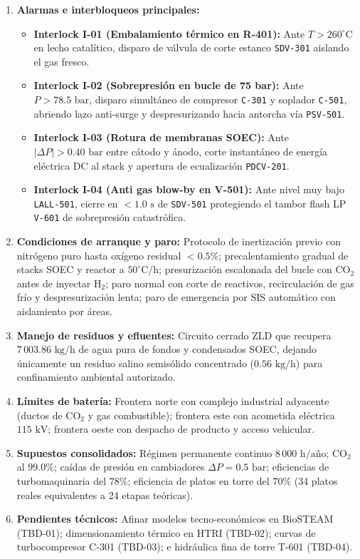 \documentclass[10pt,letterpaper]{article}
\begin{document}
\begin{enumerate}
    \item \textbf{Alarmas e interbloqueos principales:}
    \begin{itemize}
        \item \textbf{Interlock I-01 (Embalamiento térmico en R-401):} Ante $T > 260^\circ\text{C}$ en lecho catalítico, disparo de válvula de corte estanco \texttt{SDV-301} aislando el gas fresco.
        \item \textbf{Interlock I-02 (Sobrepresión en bucle de 75 bar):} Ante $P > 78.5\text{ bar}$, disparo simultáneo de compresor \texttt{C-301} y soplador \texttt{C-501}, abriendo lazo anti-surge y despresurizando hacia antorcha vía \texttt{PSV-501}.
        \item \textbf{Interlock I-03 (Rotura de membranas SOEC):} Ante $|\Delta P| > 0.40\text{ bar}$ entre cátodo y ánodo, corte instantáneo de energía eléctrica DC al stack y apertura de ecualización \texttt{PDCV-201}.
        \item \textbf{Interlock I-04 (Anti gas blow-by en V-501):} Ante nivel muy bajo \texttt{LALL-501}, cierre en $<1.0\text{ s}$ de \texttt{SDV-501} protegiendo el tambor flash LP \texttt{V-601} de sobrepresión catastrófica.
    \end{itemize}
    \item \textbf{Condiciones de arranque y paro:} Protocolo de inertización previo con nitrógeno puro hasta oxígeno residual $<0.5\%$; precalentamiento gradual de stacks SOEC y reactor a $50^\circ\text{C/h}$; presurización escalonada del bucle con $\text{CO}_2$ antes de inyectar $\text{H}_2$; paro normal con corte de reactivos, recirculación de gas frío y despresurización lenta; paro de emergencia por SIS automático con aislamiento por áreas.
    \item \textbf{Manejo de residuos y efluentes:} Circuito cerrado ZLD que recupera $7\,003.86\text{ kg/h}$ de agua pura de fondos y condensados SOEC, dejando únicamente un residuo salino semisólido concentrado ($0.56\text{ kg/h}$) para confinamiento ambiental autorizado.
    \item \textbf{Límites de batería:} Frontera norte con complejo industrial adyacente (ductos de $\text{CO}_2$ y gas combustible); frontera este con acometida eléctrica $115\text{ kV}$; frontera oeste con despacho de producto y acceso vehicular.
    \item \textbf{Supuestos consolidados:} Régimen permanente continuo $8\,000\text{ h/año}$; $\text{CO}_2$ al $99.0\%$; caídas de presión en cambiadores $\Delta P = 0.5\text{ bar}$; eficiencias de turbomaquinaria del $78\%$; eficiencia de platos en torre del $70\%$ (34 platos reales equivalentes a 24 etapas teóricas).
    \item \textbf{Pendientes técnicos:} Afinar modelos tecno-económicos en BioSTEAM (TBD-01); dimensionamiento térmico en HTRI (TBD-02); curvas de turbocompresor C-301 (TBD-03); e hidráulica fina de torre T-601 (TBD-04).
\end{enumerate}
\end{document}
